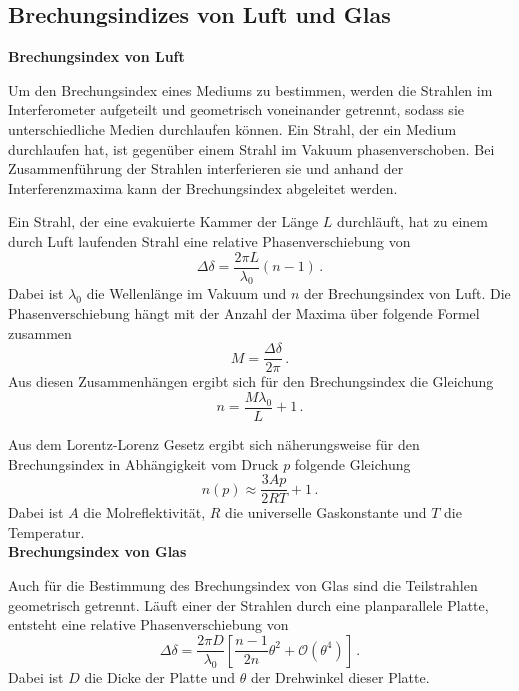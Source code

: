 \subsection{Brechungsindizes von Luft und Glas}
\textbf{Brechungsindex von Luft}

Um den Brechungsindex eines Mediums zu bestimmen, werden die Strahlen im Interferometer aufgeteilt und geometrisch voneinander getrennt, sodass sie unterschiedliche Medien durchlaufen können. Ein Strahl, der ein Medium durchlaufen hat, ist gegenüber einem Strahl im Vakuum phasenverschoben. Bei Zusammenführung der Strahlen interferieren sie und anhand der Interferenzmaxima kann der Brechungsindex abgeleitet werden. %

Ein Strahl, der eine evakuierte Kammer der Länge $L$ durchläuft, hat zu einem durch Luft laufenden Strahl eine relative Phasenverschiebung von %
\begin{equation*}
    \Delta \delta = \frac{2 \pi L}{\lambda_{0}} (n-1) \, .
\end{equation*}
Dabei ist $\lambda_0$ die Wellenlänge im Vakuum und $n$ der Brechungsindex von Luft.
Die Phasenverschiebung hängt mit der Anzahl der Maxima über folgende Formel zusammen 
\begin{equation*}
    M = \frac{\Delta \delta}{2 \pi} \, . 
\end{equation*}
Aus diesen Zusammenhängen ergibt sich für den Brechungsindex die Gleichung
\begin{equation}
    n = \frac{M \lambda_0}{L} + 1 \, .
    \label{eq:brechungsindex}
\end{equation}

Aus dem Lorentz-Lorenz Gesetz
ergibt sich näherungsweise für den Brechungsindex in Abhängigkeit vom Druck $p$ folgende Gleichung
\begin{equation*}
    n(p) \approx \frac{3 A p}{2 R T} + 1 \,.
    \label{eq:n_p}
\end{equation*}
Dabei ist $A$ die Molreflektivität, $R$ die universelle Gaskonstante und $T$ die Temperatur.
\\


\textbf{Brechungsindex von Glas}

Auch für die Bestimmung des Brechungsindex von Glas sind die Teilstrahlen geometrisch getrennt. Läuft einer der Strahlen durch eine planparallele Platte, entsteht eine relative Phasenverschiebung von
\begin{equation*}
    \Delta \delta = \frac{2 \pi D}{\lambda_0} \left[ \frac{n-1}{2n} \theta^2 + {\mathcal{O}}(\theta^4) \right] \, .
\end{equation*}
Dabei ist $D$ die Dicke der Platte und $\theta$ der Drehwinkel dieser Platte.

